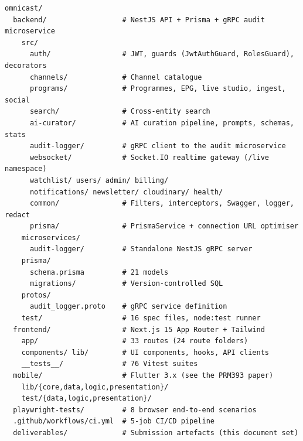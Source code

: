 \begin{lstlisting}[caption={\bi{Cấu trúc thư mục ở mức tổng quát.}{Directory
structure at a high level.}}]
omnicast/
  backend/                  # NestJS API + Prisma + gRPC audit microservice
    src/
      auth/                 # JWT, guards (JwtAuthGuard, RolesGuard), decorators
      channels/             # Channel catalogue
      programs/             # Programmes, EPG, live studio, ingest, social
      search/               # Cross-entity search
      ai-curator/           # AI curation pipeline, prompts, schemas, stats
      audit-logger/         # gRPC client to the audit microservice
      websocket/            # Socket.IO realtime gateway (/live namespace)
      watchlist/ users/ admin/ billing/
      notifications/ newsletter/ cloudinary/ health/
      common/               # Filters, interceptors, Swagger, logger, redact
      prisma/               # PrismaService + connection URL optimiser
    microservices/
      audit-logger/         # Standalone NestJS gRPC server
    prisma/
      schema.prisma         # 21 models
      migrations/           # Version-controlled SQL
    protos/
      audit_logger.proto    # gRPC service definition
    test/                   # 16 spec files, node:test runner
  frontend/                 # Next.js 15 App Router + Tailwind
    app/                    # 33 routes (24 route folders)
    components/ lib/        # UI components, hooks, API clients
    __tests__/              # 76 Vitest suites
  mobile/                   # Flutter 3.x (see the PRM393 paper)
    lib/{core,data,logic,presentation}/
    test/{data,logic,presentation}/
  playwright-tests/         # 8 browser end-to-end scenarios
  .github/workflows/ci.yml  # 5-job CI/CD pipeline
  deliverables/             # Submission artefacts (this document set)
\end{lstlisting}
